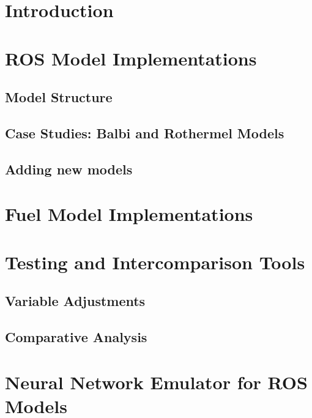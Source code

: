 \documentclass{article}
\begin{document}
\section{Introduction}

\section{ROS Model Implementations}
\subsection{Model Structure}

\subsection{Case Studies: Balbi and Rothermel Models}

\subsection{Adding new models}

\section{Fuel Model Implementations}

\section{Testing and Intercomparison Tools}
\subsection{Variable Adjustments}
\subsection{Comparative Analysis}

\section{Neural Network Emulator for ROS Models}
\end{document}
